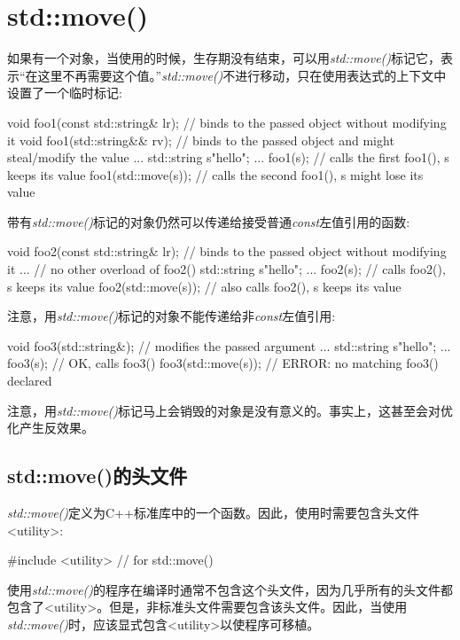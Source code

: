 \section{std::move()}
如果有一个对象，当使用的时候，生存期没有结束，可以用\textit{std::move()}标记它，表示“在这里不再需要这个值。”\textit{std::move()}不进行移动，只在使用表达式的上下文中设置了一个临时标记:

\begin{cppcode}
void foo1(const std::string& lr); // binds to the passed object without modifying it
void foo1(std::string&& rv); // binds to the passed object and might steal/modify the value
...
std::string s{"hello"};
...
foo1(s); // calls the first foo1(), s keeps its value
foo1(std::move(s)); // calls the second foo1(), s might lose its value
\end{cppcode}

带有\textit{std::move()}标记的对象仍然可以传递给接受普通\textit{const}左值引用的函数:

\begin{cppcode}
void foo2(const std::string& lr); // binds to the passed object without modifying it
... // no other overload of foo2()
std::string s{"hello"};
...
foo2(s); // calls foo2(), s keeps its value
foo2(std::move(s)); // also calls foo2(), s keeps its value
\end{cppcode}

注意，用\textit{std::move()}标记的对象不能传递给非\textit{const}左值引用:

\begin{cppcode}
void foo3(std::string&); // modifies the passed argument
...
std::string s{"hello"};
...
foo3(s); // OK, calls foo3()
foo3(std::move(s)); // ERROR: no matching foo3() declared
\end{cppcode}

注意，用\textit{std::move()}标记马上会销毁的对象是没有意义的。事实上，这甚至会对优化产生反效果。

\subsection{std::move()的头文件}

\textit{std::move()}定义为C++标准库中的一个函数。因此，使用时需要包含头文件<utility>:

\begin{cppcode}
#include <utility> // for std::move()
\end{cppcode}

使用\textit{std::move()}的程序在编译时通常不包含这个头文件，因为几乎所有的头文件都包含了<utility>。但是，非标准头文件需要包含该头文件。因此，当使用\textit{std::move()}时，应该显式包含<utility>以使程序可移植。

